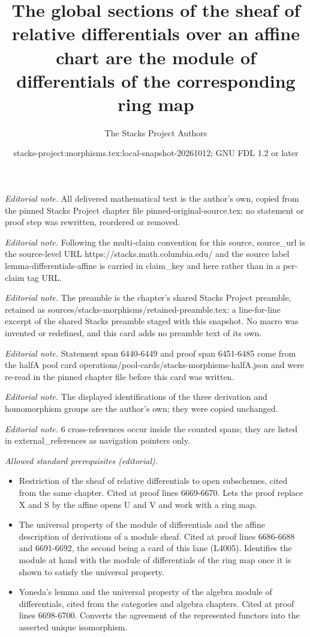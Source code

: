\documentclass[10pt,a4paper]{amsart}
\title{The global sections of the sheaf of relative differentials over an affine chart are the module of differentials of the corresponding ring map}
\author{The Stacks Project Authors}
\date{stacks-project:morphisms.tex:local-snapshot-20261012; GNU FDL 1.2 or later}
\theoremstyle{plain}
\theoremstyle{definition}
\theoremstyle{remark}
\numberwithin{equation}{subsection}
\begin{document}
\maketitle
\noindent\textit{Editorial note.} All delivered mathematical text is the author's own, copied from the pinned Stacks Project chapter file pinned-original-source.tex; no statement or proof step was rewritten, reordered or removed.\par\medskip
\noindent\textit{Editorial note.} Following the multi-claim convention for this source, source\_url is the source-level URL https://stacks.math.columbia.edu/ and the source label lemma-differentials-affine is carried in claim\_key and here rather than in a per-claim tag URL.\par\medskip
\noindent\textit{Editorial note.} The preamble is the chapter's shared Stacks Project preamble, retained as sources/stacks-morphisms/retained-preamble.tex: a line-for-line excerpt of the shared Stacks preamble staged with this snapshot. No macro was invented or redefined, and this card adds no preamble text of its own.\par\medskip
\noindent\textit{Editorial note.} Statement span 6440-6449 and proof span 6451-6485 come from the halfA pool card operations/pool-cards/stacks-morphisms-halfA.json and were re-read in the pinned chapter file before this card was written.\par\medskip
\noindent\textit{Editorial note.} The displayed identifications of the three derivation and homomorphism groups are the author's own; they were copied unchanged.\par\medskip
\noindent\textit{Editorial note.} 6 cross-references occur inside the counted spans; they are listed in external\_references as navigation pointers only.\par\medskip
\noindent\textit{Allowed standard prerequisites (editorial).}\begin{itemize}
\item Restriction of the sheaf of relative differentials to open subschemes, cited from the same chapter. Cited at proof lines 6669-6670. Lets the proof replace X and S by the affine opens U and V and work with a ring map.
\item The universal property of the module of differentials and the affine description of derivations of a module sheaf. Cited at proof lines 6686-6688 and 6691-6692, the second being a card of this lane (L4005). Identifies the module at hand with the module of differentials of the ring map once it is shown to satisfy the universal property.
\item Yoneda's lemma and the universal property of the algebra module of differentials, cited from the categories and algebra chapters. Cited at proof lines 6698-6700. Converts the agreement of the represented functors into the asserted unique isomorphism.
\end{itemize}\medskip
\end{document}
